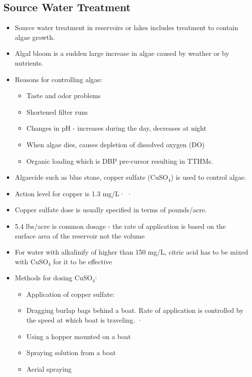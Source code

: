 \begin{itemize}
\subsection{Source Water Treatment}
\begin{itemize}
\item Source water treatment in reservoirs or lakes includes treatment to contain algae growth.
\item Algal bloom is a sudden large increase in algae caused by weather or by nutrients. 
\item Reasons for controlling algae:
\begin{itemize}
\item Taste and odor problems
\item Shortened filter runs
\item Changes in pH - increases during the day, decreases at night
\item When algae dies, causes depletion of dissolved oxygen (DO)
\item Organic loading which is DBP pre-cursor resulting in TTHMs.
\end{itemize}
\item Algaecide such as blue stone, copper sulfate (CuSO$_4$) is used to control algae. 
\item Action level for copper is 1.3 mg/L·	·

\item Copper sulfate dose is usually specified in terms of pounds/acre. 
\item 5.4 lbs/acre is common dosage - the rate of application is based on the surface area of the reservoir not the volume
\item For water with alkalinify of higher than 150 mg/L, citric acid has to be mixed with CuSO$_4$ for it to be effective
\item Methods for dosing CuSO$_4$:
\begin{itemize}
\item Application of copper sulfate:
\item Dragging burlap bags behind a boat. Rate of application is controlled by the speed at which boat is traveling. ·
\item Using a hopper mounted on a boat
\item Spraying solution from a boat
\item Aerial spraying 
\end{itemize}

\end{itemize}

\end{itemize}
